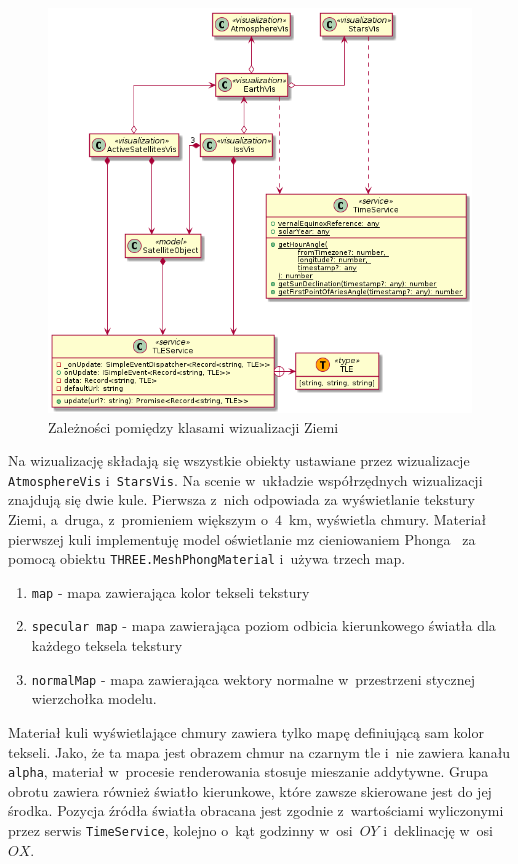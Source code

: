 \begin{figure}
  \centering
  \includegraphics[width=\textwidth]{diagrams/out/c4_earthVis.png}
  \caption{Zależności pomiędzy klasami wizualizacji Ziemi}
  \label{fig:c4_earthVis} 
\end{figure}

Na wizualizację składają się wszystkie obiekty ustawiane przez wizualizacje \texttt{AtmosphereVis} i~\texttt{StarsVis}. Na scenie w~układzie współrzędnych wizualizacji znajdują się dwie kule. Pierwsza z~nich odpowiada za wyświetlanie tekstury Ziemi, a~druga, z~promieniem większym o~$4$~km, wyświetla chmury. Materiał pierwszej kuli implementuję model oświetlanie mz cieniowaniem Phonga~\cite[Rozdział 3]{RealTime3DGraphics} za pomocą obiektu \texttt{THREE.MeshPhongMaterial} i~używa trzech map.
\begin{samepage}
\begin{enumerate}
  \item \texttt{map} - mapa zawierająca kolor tekseli tekstury
  \item \texttt{specular map} - mapa zawierająca poziom odbicia kierunkowego światła dla każdego teksela tekstury
  \item \texttt{normalMap} - mapa zawierająca wektory normalne w~przestrzeni stycznej wierzchołka modelu.
\end{enumerate}
\end{samepage}
Materiał kuli wyświetlające chmury zawiera tylko mapę definiującą sam kolor tekseli. Jako, że ta mapa jest obrazem chmur na czarnym tle i~nie zawiera kanału \texttt{alpha}, materiał w~procesie renderowania stosuje mieszanie addytywne. Grupa obrotu zawiera również światło kierunkowe, które zawsze skierowane jest do jej środka. Pozycja źródła światła obracana jest zgodnie z~wartościami wyliczonymi przez serwis \texttt{TimeService}, kolejno o~kąt godzinny w~osi~$OY$ i~deklinację w~osi~$OX$.

